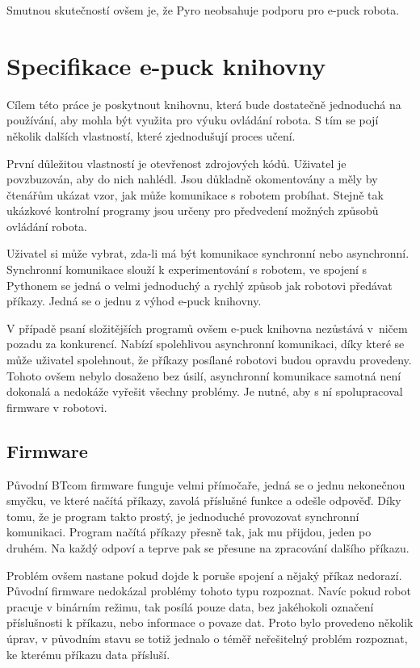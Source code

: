        Smutnou skutečností ovšem je, že Pyro neobsahuje podporu pro e-puck
        robota.

    \section{Specifikace e-puck knihovny}
    \label{specifikace}

    Cílem této práce je poskytnout knihovnu, která bude dostatečně jednoduchá
    na používání, aby mohla být využita pro výuku ovládání robota. S tím se
    pojí několik dalších vlastností, které zjednodušují proces učení.

    První důležitou vlastností je otevřenost zdrojových kódů. Uživatel je
    povzbuzován, aby do nich nahlédl. Jsou důkladně okomentovány a měly by
    čtenářům ukázat vzor, jak může komunikace s robotem probíhat. Stejně tak
    ukázkové kontrolní programy jsou určeny pro předvedení možných způsobů
    ovládání robota.

    Uživatel si může vybrat, zda-li má být komunikace synchronní nebo
    asynchronní. Synchronní komunikace slouží k experimentování s robotem, ve
    spojení s Pythonem se jedná o velmi jednoduchý a rychlý způsob jak robotovi
    předávat příkazy. Jedná se o jednu z výhod e-puck knihovny.

    V případě psaní složitějších programů ovšem e-puck knihovna nezůstává
    v~ničem pozadu za konkurencí. Nabízí spolehlivou asynchronní komunikaci,
    díky které se může uživatel spolehnout, že příkazy posílané robotovi budou
    opravdu provedeny. Tohoto ovšem nebylo dosaženo bez úsilí, asynchronní
    komunikace samotná není dokonalá a nedokáže vyřešit všechny problémy. Je
    nutné, aby s ní spolupracoval firmware v robotovi.

    \subsection{Firmware}

    Původní BTcom firmware funguje velmi přímočaře, jedná se o jednu nekonečnou
    smyčku, ve které načítá příkazy, zavolá příslušné funkce a odešle odpověď.
    Díky tomu, že je program takto prostý, je jednoduché provozovat synchronní
    komunikaci. Program načítá příkazy přesně tak, jak mu přijdou, jeden po
    druhém. Na každý odpoví a teprve pak se přesune na zpracování dalšího
    příkazu.

    Problém ovšem nastane pokud dojde k poruše spojení a nějaký příkaz
    nedorazí. Původní firmware nedokázal problémy tohoto typu rozpoznat. Navíc
    pokud robot pracuje v binárním režimu, tak posílá pouze data, bez
    jakéhokoli označení příslušnosti k příkazu, nebo informace o povaze dat.
    Proto bylo provedeno několik úprav, v původním stavu se totiž jednalo o
    téměř neřešitelný problém rozpoznat, ke kterému příkazu data přísluší.

